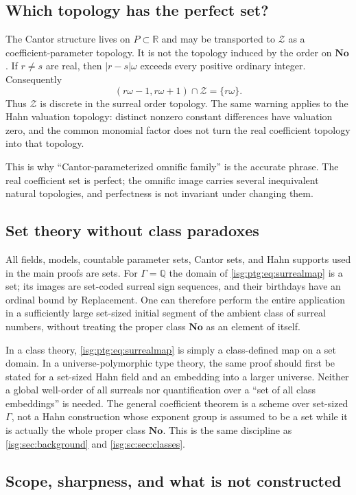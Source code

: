 \documentclass[11pt]{article}
\theoremstyle{definition}
\theoremstyle{remark}
\newcommand{\No}{\ensuremath{\mathbf{No}}}
\newcommand{\R}{\mathbb{R}}
\newcommand{\Q}{\mathbb{Q}}
\begin{document}
\subsection{Which topology has the perfect set?}\label{isg:ptg:sec:topologies}
The Cantor structure lives on $P\subset\R$ and may be transported to
$\mathcal Z$ as a coefficient-parameter topology. It is not the topology
induced by the order on $\No$. If $r\ne s$ are real, then $|r-s|\omega$
exceeds every positive ordinary integer. Consequently
\[
 (r\omega-1,r\omega+1)\cap\mathcal Z=\{r\omega\}.
\]
Thus $\mathcal Z$ is discrete in the surreal order topology. The same
warning applies to the Hahn valuation topology: distinct nonzero constant
differences have valuation zero, and the common monomial factor does not
turn the real coefficient topology into that topology.

This is why ``Cantor-parameterized omnific family'' is the accurate phrase.
The real coefficient set is perfect; the omnific image carries several
inequivalent natural topologies, and perfectness is not invariant under
changing them.

\subsection{Set theory without class paradoxes}\label{isg:ptg:sec:classes}
All fields, models, countable parameter sets, Cantor sets, and Hahn
supports used in the main proofs are sets. For $\Gamma=\Q$ the domain of
\eqref{isg:ptg:eq:surrealmap} is a set; its images are set-coded surreal
sign sequences, and their birthdays have an ordinal bound by Replacement.
One can therefore perform the entire application in a sufficiently large
set-sized initial segment of the ambient class of surreal numbers, without
treating the proper class $\No$ as an element of itself.

In a class theory, \eqref{isg:ptg:eq:surrealmap} is simply a class-defined
map on a set domain. In a universe-polymorphic type theory, the same proof
should first be stated for a set-sized Hahn field and an embedding into a
larger universe. Neither a global well-order of all surreals nor
quantification over a ``set of all class embeddings'' is needed. The
general coefficient theorem is a scheme over set-sized $\Gamma$, not a Hahn
construction whose exponent group is assumed to be a set while it is
actually the whole proper class $\No$. This is the same discipline as
\cref{isg:sec:background} and \cref{isg:sc:sec:classes}.

\subsection{Scope, sharpness, and what is not constructed}\label{isg:ptg:sec:limits}
\end{document}
